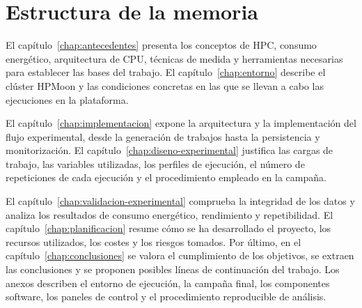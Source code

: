 \section{Estructura de la memoria}
\label{sec:introduccion_estructura}

El capítulo~\ref{chap:antecedentes} presenta los conceptos de HPC, consumo energético, arquitectura de CPU, técnicas de medida y herramientas necesarias para establecer las bases del trabajo. El capítulo~\ref{chap:entorno} describe el clúster HPMoon y las condiciones concretas en las que se llevan a cabo las ejecuciones en la plataforma.

El capítulo~\ref{chap:implementacion} expone la arquitectura y la implementación del flujo experimental, desde la generación de trabajos hasta la persistencia y monitorización. El capítulo~\ref{chap:diseno-experimental} justifica las cargas de trabajo, las variables utilizadas, los perfiles de ejecución, el número de repeticiones de cada ejecución y el procedimiento empleado en la campaña.

El capítulo~\ref{chap:validacion-experimental} comprueba la integridad de los datos y analiza los resultados de consumo energético, rendimiento y repetibilidad. El capítulo~\ref{chap:planificacion} resume cómo se ha desarrollado el proyecto, los recursos utilizados, los costes y los riesgos tomados. Por último, en el capítulo~\ref{chap:conclusiones} se valora el cumplimiento de los objetivos, se extraen las conclusiones y se proponen posibles líneas de continuación del trabajo. Los anexos describen el entorno de ejecución, la campaña final, los componentes software, los paneles de control y el procedimiento reproducible de análisis.
